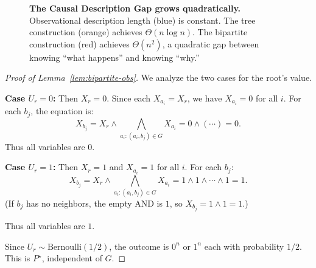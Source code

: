 \documentclass{article}
\theoremstyle{plain}
\theoremstyle{definition}
\newcommand{\DL}{\mathrm{DL}}
\begin{document}
\begin{figure}[t]
    \centering
    \caption{\textbf{The Causal Description Gap grows quadratically.} Observational description length (blue) is constant. The tree construction (orange) achieves $\Theta(n \log n)$. The bipartite construction (red) achieves $\Theta(n^2)$, a quadratic gap between knowing ``what happens'' and knowing ``why.''}
    \label{fig:gap-comparison}
\end{figure}

\begin{proof}[Proof of Lemma~\ref{lem:bipartite-obs}]
We analyze the two cases for the root's value.

\textbf{Case $U_r = 0$:} Then $X_r = 0$. Since each $X_{a_i} = X_r$, we have $X_{a_i} = 0$ for all $i$. For each $b_j$, the equation is:
\[
X_{b_j} = X_r \wedge \bigwedge_{a_i : (a_i, b_j) \in G} X_{a_i} = 0 \wedge (\cdots) = 0.
\]
Thus all variables are $0$.

\textbf{Case $U_r = 1$:} Then $X_r = 1$ and $X_{a_i} = 1$ for all $i$. For each $b_j$:
\[
X_{b_j} = X_r \wedge \bigwedge_{a_i : (a_i, b_j) \in G} X_{a_i} = 1 \wedge 1 \wedge \cdots \wedge 1 = 1.
\]
(If $b_j$ has no neighbors, the empty AND is $1$, so $X_{b_j} = 1 \wedge 1 = 1$.)

Thus all variables are $1$.

Since $U_r \sim \mathrm{Bernoulli}(1/2)$, the outcome is $0^n$ or $1^n$ each with probability $1/2$. This is $P^\star$, independent of $G$.
\end{proof}
\end{document}
